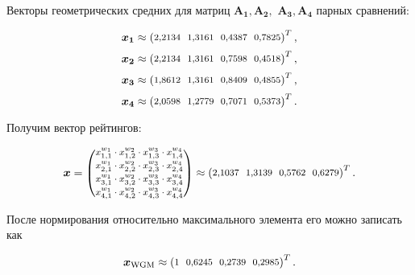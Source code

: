 \documentclass{math-mech-sci}
\begin{document}
Векторы геометрических средних 
для матриц $\boldsymbol{A_1}, \boldsymbol{A_2},$ $\boldsymbol{A_3}, \boldsymbol{A_4}$ парных сравнений:
\vspace{-1.5ex}

\[
\boldsymbol{x_1}\approx
\footnotesize
\setlength{\arraycolsep}{3pt}
\begin{pmatrix}
2{,}2134 & 1{,}3161 & 0{,}4387 & 0{,}7825
\end{pmatrix}^T,
\]
\[
\boldsymbol{x_2}\approx
\footnotesize
\setlength{\arraycolsep}{3pt}
\begin{pmatrix}
2{,}2134 & 1{,}3161 & 0{,}7598 & 0{,}4518
\end{pmatrix}^T,
\]
\[
\boldsymbol{x_3}\approx
\footnotesize
\setlength{\arraycolsep}{3pt}
\begin{pmatrix}
1{,}8612 & 1{,}3161 & 0{,}8409 & 0{,}4855
\end{pmatrix}^T,
\]
\[
\boldsymbol{x_4}\approx
\footnotesize
\setlength{\arraycolsep}{3pt}
\begin{pmatrix}
2{,}0598 & 1{,}2779 & 0{,}7071 & 0{,}5373
\end{pmatrix}^T.
\]
\vspace{-0.2ex}

Получим вектор рейтингов:
\vspace{-0.7ex}

$$
\boldsymbol{x}=
\footnotesize
\begin{pmatrix}
x_{1,1}^{w_1} \cdot x_{1,2}^{w_2} \cdot x_{1,3}^{w_3} \cdot x_{1,4}^{w_4} \\[0.7ex]
x_{2,1}^{w_1} \cdot x_{2,2}^{w_2} \cdot x_{2,3}^{w_3} \cdot x_{2,4}^{w_4} \\[0.7ex]
x_{3,1}^{w_1} \cdot x_{3,2}^{w_2} \cdot x_{3,3}^{w_3} \cdot x_{3,4}^{w_4} \\[0.7ex]
x_{4,1}^{w_1} \cdot x_{4,2}^{w_2} \cdot x_{4,3}^{w_3} \cdot x_{4,4}^{w_4}
\end{pmatrix}
\normalsize
\approx 
\setlength{\arraycolsep}{3pt}
\footnotesize
\begin{pmatrix}
2{,}1037 &   1{,}3139 &  0{,}5762 &  0{,}6279
\end{pmatrix}^T.
$$
\vspace{0.2ex}

После нормирования относительно максимального элемента его можно записать как 
\vspace{-1.5ex}

\[
\boldsymbol{x}_{\mathrm{WGM}}\approx 
\footnotesize
\setlength{\arraycolsep}{3pt}
\begin{pmatrix}
1 &   0{,}6245 &   0{,}2739 &  0{,}2985
\end{pmatrix}^T.
\]
\end{document}

